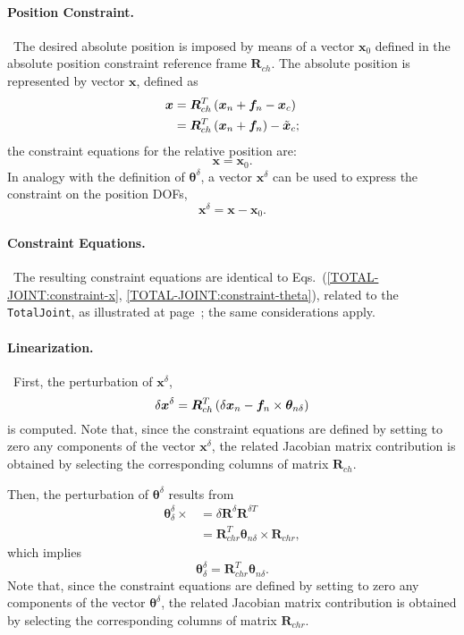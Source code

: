 \documentclass[10pt,fleqn,subeqn]{report}
\newcommand{\T}[1]{\bm{#1}}
\newcommand{\dofs}{DOFs}
\begin{document}
\paragraph{Position Constraint.} \
The desired absolute position is imposed by means of a vector $\T{x}_0$
defined in the absolute position constraint reference frame $\T{R}_{ch}$.
The absolute position is represented by vector $\T{x}$, defined as
\begin{align}
	\T{x} &= \T{R}_{ch}^T\plbr{
		\T{x}_n + \T{f}_n - \T{x}_c
	} \nonumber \\
	&= \T{R}_{ch}^T\plbr{
		\T{x}_n + \T{f}_n
	} - \tilde{\T{x}}_c ;
\end{align}
the constraint equations for the relative position are:
\begin{equation}
	\T{x} = \T{x}_0 .
\end{equation}
In analogy with the definition of $\T{\theta}^{\delta}$, a vector
$\T{x}^{\delta}$ can be used to express the constraint
on the position \dofs,
\begin{equation}
	\T{x}^{\delta} = \T{x} - \T{x}_0 .
\end{equation}

\paragraph{Constraint Equations.} \
The resulting constraint equations are identical
to Eqs.~(\ref{TOTAL-JOINT:constraint-x}, \ref{TOTAL-JOINT:constraint-theta}),
related to the \texttt{TotalJoint}, as illustrated
at page~\pageref{TOTAL-JOINT:constraint-x};
the same considerations apply.

\paragraph{Linearization.} \
First, the perturbation of $\T{x}^{\delta}$,
\begin{equation}
	\delta \T{x}^{\delta} = 
	\T{R}_{ch}^T\plbr{
		\delta\T{x}_n - \T{f}_n \times \T{\theta}_{n\delta}
	}
\end{equation}
is computed.
Note that, since the constraint equations are defined by setting 
to zero any components of the vector $\T{x}^{\delta}$, the
related Jacobian matrix contribution is obtained by selecting 
the corresponding columns of matrix $\T{R}_{ch}$.

Then, the perturbation of $\T{\theta}^{\delta}$ results from
\begin{align}
	\T{\theta}^{\delta}_{\delta} \times{}
	&= \delta\T{R}^{\delta} \T{R}^{\delta T} \nonumber \\
	&= \T{R}_{chr}^T \T{\theta}_{n\delta} \times \T{R}_{chr} ,
\end{align}
which implies
\begin{equation}
	\T{\theta}^{\delta}_{\delta} = \T{R}_{chr}^T \T{\theta}_{n\delta} .
\end{equation}
Note that, since the constraint equations are defined by setting 
to zero any components of the vector $\T{\theta}^{\delta}$, the
related Jacobian matrix contribution is obtained by selecting 
the corresponding columns of matrix $\T{R}_{chr}$.
\end{document}
